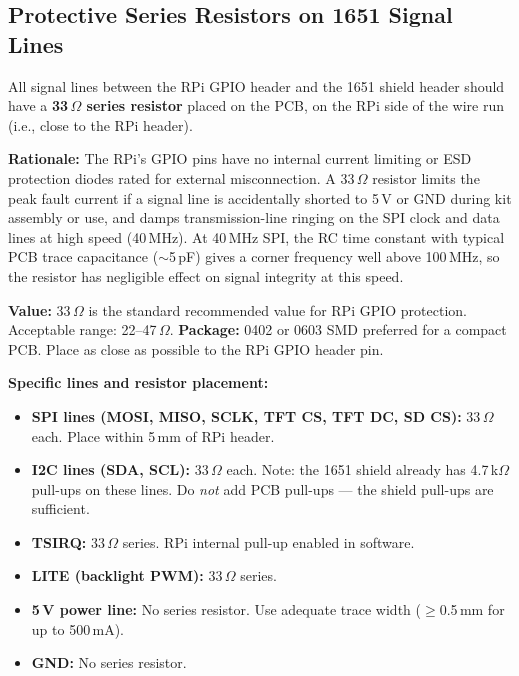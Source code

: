 \documentclass[11pt,a4paper]{article}
\begin{document}
\subsection{Protective Series Resistors on 1651 Signal Lines}

All signal lines between the RPi GPIO header and the 1651 shield header
should have a \textbf{33\,$\Omega$ series resistor} placed on the PCB,
on the RPi side of the wire run (i.e., close to the RPi header).

\begin{notebox}
\textbf{Rationale:}
The RPi's GPIO pins have no internal current limiting or ESD protection diodes
rated for external misconnection.
A 33\,$\Omega$ resistor limits the peak fault current if a signal line is
accidentally shorted to 5\,V or GND during kit assembly or use,
and damps transmission-line ringing on the SPI clock and data lines
at high speed (40\,MHz).
At 40\,MHz SPI, the RC time constant with typical PCB trace capacitance
($\sim$5\,pF) gives a corner frequency well above 100\,MHz,
so the resistor has negligible effect on signal integrity at this speed.

\smallskip
\textbf{Value:} 33\,$\Omega$ is the standard recommended value for RPi GPIO protection.
Acceptable range: 22--47\,$\Omega$.
\textbf{Package:} 0402 or 0603 SMD preferred for a compact PCB.
Place as close as possible to the RPi GPIO header pin.
\end{notebox}

\textbf{Specific lines and resistor placement:}

\begin{itemize}[noitemsep]
  \item \textbf{SPI lines (MOSI, MISO, SCLK, TFT CS, TFT DC, SD CS):}
        33\,$\Omega$ each. Place within 5\,mm of RPi header.
  \item \textbf{I2C lines (SDA, SCL):}
        33\,$\Omega$ each. Note: the 1651 shield already has 4.7\,k$\Omega$ pull-ups
        on these lines. Do \emph{not} add PCB pull-ups --- the shield pull-ups are sufficient.
  \item \textbf{TSIRQ:} 33\,$\Omega$ series. RPi internal pull-up enabled in software.
  \item \textbf{LITE (backlight PWM):} 33\,$\Omega$ series.
  \item \textbf{5\,V power line:} No series resistor. Use adequate trace width
        ($\geq$0.5\,mm for up to 500\,mA).
  \item \textbf{GND:} No series resistor.
\end{itemize}
\end{document}
